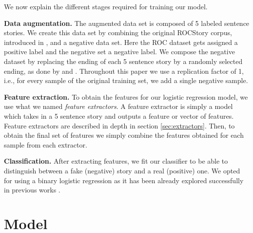 \documentclass{article}
\begin{document}
We now explain the different stages required for training our model.

\textbf{Data augmentation.} The augmented data set is composed of 5 labeled
sentence stories. We create this data set by combining the original ROCStory
corpus, introduced in \cite{ROCstories}, and a negative data set. Here the ROC
dataset gets assigned a positive label and the negative set a negative label. We
compose the negative dataset by replacing the ending of each 5 sentence story by
a randomly selected ending, as done by \cite{LSTMClassifier} and
\cite{SENTENCE_EMB}. Throughout this paper we use a replication factor of 1,
i.e., for every sample of the original training set, we add a single negative
sample.

\textbf{Feature extraction.} To obtain the features for our logistic regression
model, we use what we named {\it feature extractors}. A feature extractor is
simply a model which takes in a 5 sentence story and outputs a feature or vector
of features. Feature extractors are described in depth in section
\ref{sec:extractors}. Then, to obtain the final set of features we simply
combine the features obtained for each sample from each extractor.

\textbf{Classification.} After extracting features, we fit our classifier to be
able to distinguish between a fake (negative) story and a real (positive) one.
We opted for using a binary logistic regression as it has been already explored
successfully in previous works \cite{UWNLP,Goel,COGCOMP}.


\section{Model}
\end{document}
